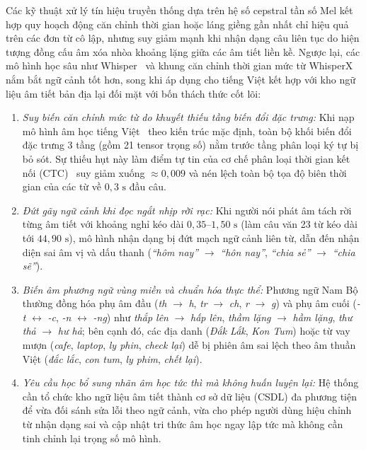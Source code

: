 \documentclass[12pt,a4paper]{article}
\begin{document}
Các kỹ thuật xử lý tín hiệu truyền thống dựa trên hệ số cepstral tần số Mel kết hợp quy hoạch động căn chỉnh thời gian hoặc láng giềng gần nhất chỉ hiệu quả trên các đơn từ cô lập, nhưng suy giảm mạnh khi nhận dạng câu liên tục do hiện tượng đồng cấu âm xóa nhòa khoảng lặng giữa các âm tiết liền kề. Ngược lại, các mô hình học sâu như Whisper~\cite{radford2023whisper} và khung căn chỉnh thời gian mức từ WhisperX~\cite{bain2023whisperx} nắm bắt ngữ cảnh tốt hơn, song khi áp dụng cho tiếng Việt kết hợp với kho ngữ liệu âm tiết bản địa lại đối mặt với bốn thách thức cốt lõi:
\begin{enumerate}
  \item \textit{Suy biến căn chỉnh mức từ do khuyết thiếu tầng biến đổi đặc trưng:} Khi nạp mô hình âm học tiếng Việt~\cite{nguyen2021vlsp} theo kiến trúc mặc định, toàn bộ khối biến đổi đặc trưng 3 tầng (gồm 21 tensor trọng số) nằm trước tầng phân loại ký tự bị bỏ sót. Sự thiếu hụt này làm điểm tự tin của cơ chế phân loại thời gian kết nối (CTC)~\cite{graves2006ctc} suy giảm xuống $\approx 0{,}009$ và nén lệch toàn bộ tọa độ biên thời gian của các từ về $0{,}3\text{ s}$ đầu câu.
  \item \textit{Đứt gãy ngữ cảnh khi đọc ngắt nhịp rời rạc:} Khi người nói phát âm tách rời từng âm tiết với khoảng nghỉ kéo dài $0{,}35\text{--}1{,}50\text{ s}$ (làm câu văn 23 từ kéo dài tới $44{,}90\text{ s}$), mô hình nhận dạng bị đứt mạch ngữ cảnh liên từ, dẫn đến nhận diện sai âm vị và dấu thanh (\textit{``hôm nay''} $\to$ \textit{``hôn nay''}, \textit{``chia sẻ''} $\to$ \textit{``chia sẽ''}).
  \item \textit{Biến âm phương ngữ vùng miền và chuẩn hóa thực thể:} Phương ngữ Nam Bộ thường đồng hóa phụ âm đầu (\textit{th} $\to$ \textit{h}, \textit{tr} $\to$ \textit{ch}, \textit{r} $\to$ \textit{g}) và phụ âm cuối (\textit{-t} $\leftrightarrow$ \textit{-c}, \textit{-n} $\leftrightarrow$ \textit{-ng}) như \textit{thắp lên} $\to$ \textit{hấp lên}, \textit{thầm lặng} $\to$ \textit{hầm lặng}, \textit{thư thả} $\to$ \textit{hư hả}; bên cạnh đó, các địa danh (\textit{Đắk Lắk}, \textit{Kon Tum}) hoặc từ vay mượn (\textit{cafe}, \textit{laptop}, \textit{ly phin}, \textit{check lại}) dễ bị phiên âm sai lệch theo âm thuần Việt (\textit{đắc lắc}, \textit{con tum}, \textit{ly phim}, \textit{chết lại}).
  \item \textit{Yêu cầu học bổ sung nhãn âm học tức thì mà không huấn luyện lại:} Hệ thống cần tổ chức kho ngữ liệu âm tiết thành cơ sở dữ liệu (CSDL) đa phương tiện để vừa đối sánh sửa lỗi theo ngữ cảnh, vừa cho phép người dùng hiệu chỉnh từ nhận dạng sai và cập nhật tri thức âm học ngay lập tức mà không cần tinh chỉnh lại trọng số mô hình.
\end{enumerate}
\end{document}

